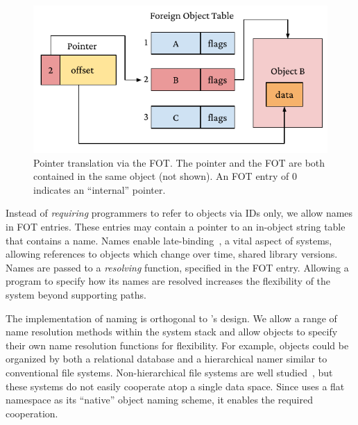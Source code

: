 \begin{figure}
    \includegraphics[width=\linewidth]{fig/ptrfot}
    \caption[FOT translation]{Pointer translation via the FOT\@.
        The pointer and the FOT
        are both contained in the same object (not shown). An FOT entry of $0$ indicates an ``internal''
        pointer.
    }
    \label{fig:fottran}
\end{figure}

Instead of \emph{requiring} programmers to refer to objects via IDs only, we allow
names in FOT entries. These entries may contain a pointer to an
in-object string table that contains a name.
Names enable late-binding~\cite{daley:cacm68}, a
vital aspect of systems, allowing references to objects which change over time, \eg shared library versions.
Names are passed to a \textit{resolving} function, specified in the FOT entry.
Allowing a program to specify how its names are resolved
increases the flexibility of the system beyond supporting \unix paths.

The implementation of naming is orthogonal to \Twizzler's design. We
allow a range of name resolution methods within the system stack
and allow objects to specify their own name resolution functions for flexibility. For example,
objects could be organized by both a relational database and a hierarchical namer
similar to conventional file systems. Non-hierarchical file systems
are well studied~\cite{gifford:sosp91, ames:mss06, padioleau:usenix03, gopal:osdi99,
    parkerwood:systor14}, but these systems do not easily cooperate atop a single data space.
Since \Twizzler uses a flat namespace as its ``native'' object naming scheme, it
enables the required cooperation.


